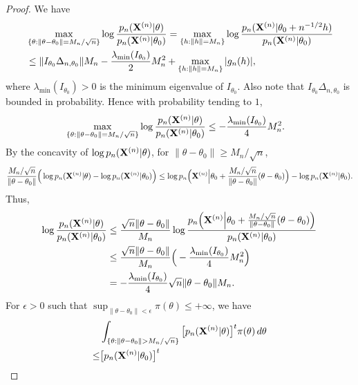 \documentclass[3p]{elsarticle}
\theoremstyle{plain}
\theoremstyle{definition}
\theoremstyle{remark}
\begin{document}
\begin{proof}
    We have
    $$
    \begin{aligned}
        &\max_{\{\theta:\|\theta-\theta_0\|=M_n/\sqrt{n}\}}
    \log\frac{p_n(\BX^{(n)}|\theta)}{p_n(\BX^{(n)}|\theta_0)}
    =
    \max_{\{h:\|h\|=M_n\}}
    \log\frac{p_n(\BX^{(n)}|\theta_0+n^{-1/2}h)}{p_n(\BX^{(n)}|\theta_0)}
        \\
        &\leq
         \|I_{\theta_0}\Delta_{n,\theta_0}\| M_n -\frac{\lambda_{\min}(I_{\theta_0})}{2} M_n^2+
        \max_{\{h:\|h\|=M_n\}}|g_n(h)|,
    \end{aligned}
    $$
    where $\lambda_{\min}(I_{\theta_0})>0$ is the minimum eigenvalue of $I_{\theta_0}$.
    Also note that $I_{\theta_0}\Delta_{n,\theta_0}$ is bounded in probability. Hence with probability tending to $1$,
    $$
    \begin{aligned}
        &\max_{\{\theta:\|\theta-\theta_0\|=M_n/\sqrt{n}\}}
    \log\frac{p_n(\BX^{(n)}|\theta)}{p_n(\BX^{(n)}|\theta_0)}
        \leq 
        -\frac{\lambda_{\min}(I_{\theta_0})}{4}M_n^2.
    \end{aligned} 
    $$
    By the concavity of $\log p_n(\BX^{(n)}|\theta)$, for $\|\theta-\theta_0\|\geq M_n/\sqrt{n}$,
    $$
     \frac{M_n/\sqrt{n}}{\|\theta-\theta_0\|}
     \Big(
     \log p_n(\BX^{(n)}|\theta)-\log p_n(\BX^{(n)}|\theta_0)
     \Big)
     \leq
     \log p_n \Big(\BX^{(n)}\Big|\theta_0+\frac{M_n/\sqrt{n}}{\|\theta-\theta_0\|}(\theta-\theta_0)\Big)-\log p_n(\BX^{(n)}|\theta_0).
    $$
    Thus,
    $$
    \begin{aligned}
     \log \frac{p_n(\BX^{(n)}|\theta)}{ p_n(\BX^{(n)}|\theta_0)}
        &\leq
        \frac{\sqrt{n}\|\theta-\theta_0\|}{M_n}
     \log \frac{p_n\Big(\BX^{(n)}\Big|\theta_0+\frac{M_n/\sqrt{n}}{\|\theta-\theta_0\|}(\theta-\theta_0)\Big)}{ p_n(\BX^{(n)}|\theta_0)}
        \\
        &\leq
        \frac{\sqrt{n}\|\theta-\theta_0\|}{M_n}
        \Big(-\frac{\lambda_{\min}(I_{\theta_0})}{4}M_n^2\Big)
        \\
        &=
        -\frac{\lambda_{\min}(I_{\theta_0})}{4}\sqrt{n}\|\theta-\theta_0\|
        M_n.
    \end{aligned}
    $$
    For $\epsilon>0$ such that $\sup_{\|\theta-\theta_0\|< \epsilon}\pi(\theta)\leq +\infty $, we have
$$
    \begin{aligned}
        &\int_{\{\theta:\|\theta-\theta_0\|> M_n/\sqrt{n}\}} \big[p_n(\BX^{(n)}|\theta)\big]^t \pi(\theta)\, d\theta
        \\
        \leq&
        \big[p_n(\BX^{(n)}|\theta_0)\big]^t 

\end{aligned}$$
\end{proof}
\end{document}
